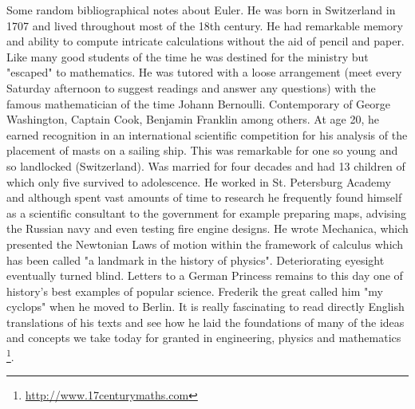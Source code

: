 \documentclass [titlepage,12pt,letter] {article}
\begin{document}
Some random bibliographical notes about Euler. He was born in
Switzerland in 1707 and lived throughout most of the 18th century. He
had remarkable memory and ability to compute intricate calculations
without the aid of pencil and paper. Like many good students of the
time he was destined for the ministry but "escaped" to mathematics. He
was tutored with a loose arrangement (meet every Saturday afternoon to
suggest readings and answer any questions) with the famous
mathematician of the time Johann Bernoulli. Contemporary of George
Washington, Captain Cook, Benjamin Franklin among others. At age 20,
he earned recognition in an international scientific competition for
his analysis of the placement of masts on a sailing ship. This was
remarkable for one so young and so landlocked (Switzerland). Was
married for four decades and had 13 children of which only five
survived to adolescence. He worked in St. Petersburg Academy and
although spent vast amounts of time to research he frequently found
himself as a scientific consultant to the government for example
preparing maps, advising the Russian navy and even testing fire engine
designs. He wrote Mechanica, which presented the Newtonian Laws of
motion within the framework of calculus which has been called "a
landmark in the history of physics". Deteriorating eyesight eventually
turned blind. Letters to a German Princess remains to this day one of
history's best examples of popular science. Frederik the great called
him "my cyclops" when he moved to Berlin. It is really fascinating to
read directly English translations of his texts and see how he laid
the foundations of many of the ideas and concepts we take today for
granted in engineering, physics and mathematics
\footnote{\url{http://www.17centurymaths.com}}. 



 
 
\end{document}

